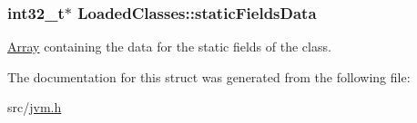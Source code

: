 \subsubsection[{\texorpdfstring{static\+Fields\+Data}{staticFieldsData}}]{\setlength{\rightskip}{0pt plus 5cm}int32\+\_\+t$\ast$ Loaded\+Classes\+::static\+Fields\+Data}\hypertarget{structLoadedClasses_adcf48dbaaaea57b514d53a8b5a3edafe}{}\label{structLoadedClasses_adcf48dbaaaea57b514d53a8b5a3edafe}


\hyperlink{structArray}{Array} containing the data for the static fields of the class. 



The documentation for this struct was generated from the following file\+:\begin{DoxyCompactItemize}
\item 
src/\hyperlink{jvm_8h}{jvm.\+h}\end{DoxyCompactItemize}
